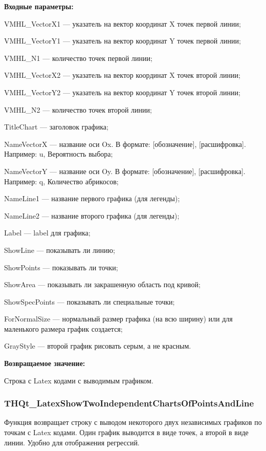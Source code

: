 \documentclass[a4paper,12pt]{article}
\begin{document}
\textbf{Входные параметры:}
 
    VMHL\_VectorX1 --- указатель на вектор координат X точек первой линии;
 
    VMHL\_VectorY1 --- указатель на вектор координат Y точек первой линии;
 
    VMHL\_N1 --- количество точек первой линии;
 
    VMHL\_VectorX2 --- указатель на вектор координат X точек второй линии;
 
    VMHL\_VectorY2 --- указатель на вектор координат Y точек второй линии;
 
    VMHL\_N2 --- количество точек второй линии;
 
    TitleChart --- заголовок графика;
 
    NameVectorX --- название оси Ox. В формате: [обозначение], [расшифровка]. Например: u, Вероятность выбора;
 
    NameVectorY --- название оси Oy. В формате: [обозначение], [расшифровка]. Например: q, Количество абрикосов;
 
    NameLine1 --- название первого графика (для легенды);
 
    NameLine2 --- название второго графика (для легенды);
 
    Label --- label для графика;
 
    ShowLine --- показывать ли линию;
 
    ShowPoints --- показывать ли точки;
 
    ShowArea --- показывать ли закрашенную область под кривой;
 
    ShowSpecPoints --- показывать ли специальные точки;
 
    ForNormalSize --- нормальный размер графика (на всю ширину) или для маленького размера график создается;
 
    GrayStyle --- второй график рисовать серым, а не красным.
	
\textbf{Возвращаемое значение:}

Строка с Latex кодами с выводимым графиком.


\subsubsection{THQt\_LatexShowTwoIndependentChartsOfPointsAndLine}\label{THQt_LatexShowTwoIndependentChartsOfPointsAndLine}

Функция возвращает строку с выводом некоторого двух независимых графиков по точкам с Latex кодами. Один график выводится в виде точек, а второй в виде линии. Удобно для отображения регрессий.
\end{document}
